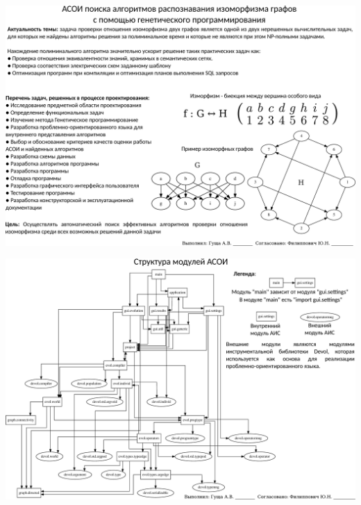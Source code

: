 \documentclass[russian,utf8, a1paper]{eskdgraph}
\begin{document}
\begin{ESKDdrawing}

\includegraphics[scale=1.0]{list1}

\end{ESKDdrawing}

\begin{ESKDdrawing}

\includegraphics[scale=1.0]{list2}

\end{ESKDdrawing}
\end{document}
